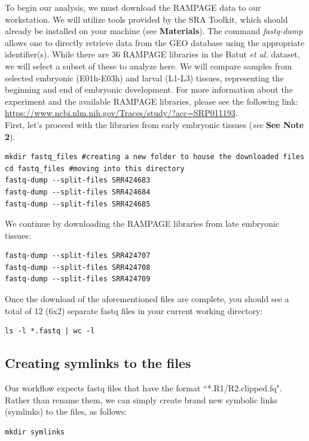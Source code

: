 \documentclass[runningheads,a4paper]{llncs}
\begin{document}
\begin{linenumbers}
To begin our analysis, we must download the RAMPAGE data to our workstation. 
We will utilize tools provided by the SRA Toolkit, which should already be installed on your machine (see \textbf{Materials}).
The command \textit{fastq-dump} allows one to directly retrieve data from the GEO database using the appropriate identifier(s).
While there are 36 RAMPAGE libraries in the Batut \textit{et al.} dataset, we will select a subset of these to analyze here.
We will compare samples from selected embryonic (E01h-E03h) and larval (L1-L3) tissues, representing the beginning and end of embryonic development.
For more information about the experiment and the available RAMPAGE libraries, please see the following link: \url{https://www.ncbi.nlm.nih.gov/Traces/study/?acc=SRP011193}.\\

First, let's proceed with the libraries from early embryonic tissues (\textit{see} \textbf{See Note 2}).

\noindent
\begin{verbatim}
mkdir fastq_files #creating a new folder to house the downloaded files
cd fastq_files #moving into this directory
fastq-dump --split-files SRR424683
fastq-dump --split-files SRR424684
fastq-dump --split-files SRR424685
\end{verbatim}

We continue by downloading the RAMPAGE libraries from late embryonic tissues:

\noindent
\begin{verbatim}
fastq-dump --split-files SRR424707
fastq-dump --split-files SRR424708
fastq-dump --split-files SRR424709
\end{verbatim}  

Once the download of the aforementioned files are complete, you should see a total of 12 (6x2) separate fastq files in your current working directory:

\noindent
\begin{verbatim}
ls -l *.fastq | wc -l
\end{verbatim}

\subsection{Creating symlinks to the files}
Our workflow expects fastq files that have the format ``*.R1/R2.clipped.fq". 
Rather than rename them, we can simply create brand new symbolic links (symlinks) to the files, as follows:

\noindent
\begin{verbatim}
mkdir symlinks


\end{verbatim}
\end{linenumbers}
\end{document}
